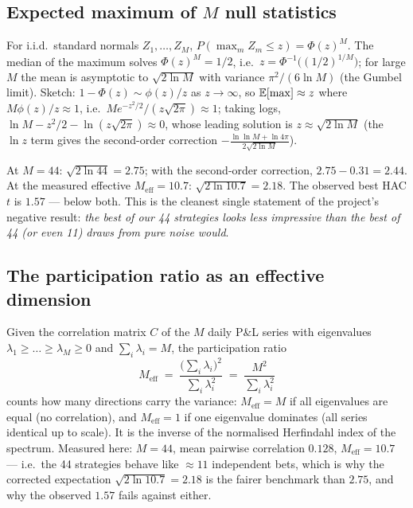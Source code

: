 \subsection{Expected maximum of $M$ null statistics}
\label{sec:der:max}

For i.i.d.\ standard normals $Z_1,\dots,Z_M$, $P(\max_m Z_m\le z)=\Phi(z)^M$. The median of
the maximum solves $\Phi(z)^M=1/2$, i.e.\ $z=\Phi^{-1}\bigl((1/2)^{1/M}\bigr)$; for large
$M$ the mean is asymptotic to $\sqrt{2\ln M}$ with variance $\pi^2/(6\ln M)$ (the Gumbel
limit). Sketch: $1-\Phi(z)\sim\phi(z)/z$ as $z\to\infty$, so $\mathbb{E}[\max]\approx z$ where
$M\phi(z)/z\approx1$, i.e.\ $M e^{-z^2/2}/(z\sqrt{2\pi})\approx1$; taking logs,
$\ln M - z^2/2 - \ln(z\sqrt{2\pi})\approx0$, whose leading solution is
$z\approx\sqrt{2\ln M}$ (the $\ln z$ term gives the second-order correction
$-\frac{\ln\ln M + \ln 4\pi}{2\sqrt{2\ln M}}$).

At $M=44$: $\sqrt{2\ln 44}=2.75$; with the second-order correction, $2.75-0.31=2.44$.
At the measured effective $M_{\text{eff}}=10.7$: $\sqrt{2\ln 10.7}=2.18$. The observed best
HAC $t$ is $1.57$ --- below both. This is the cleanest single statement of the project's
negative result: \emph{the best of our 44 strategies looks less impressive than the best of
44 (or even 11) draws from pure noise would}.

\subsection{The participation ratio as an effective dimension}
\label{sec:der:participation}

Given the correlation matrix $C$ of the $M$ daily P\&L series with eigenvalues
$\lambda_1\ge\dots\ge\lambda_M\ge0$ and $\sum_i\lambda_i=M$, the participation ratio
\begin{equation}
  M_{\text{eff}} \;=\; \frac{\bigl(\sum_i\lambda_i\bigr)^2}{\sum_i\lambda_i^2}
  \;=\; \frac{M^2}{\sum_i\lambda_i^2}
  \label{eq:participation}
\end{equation}
counts how many directions carry the variance: $M_{\text{eff}}=M$ if all eigenvalues are
equal (no correlation), and $M_{\text{eff}}=1$ if one eigenvalue dominates (all series
identical up to scale). It is the inverse of the normalised Herfindahl index of the
spectrum. Measured here: $M=44$, mean pairwise correlation $0.128$,
$M_{\text{eff}}=10.7$ --- i.e.\ the 44 strategies behave like $\approx11$ independent bets,
which is why the corrected expectation $\sqrt{2\ln 10.7}=2.18$ is the fairer benchmark than
$2.75$, and why the observed $1.57$ fails against either.

